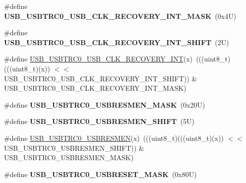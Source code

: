 \begin{DoxyCompactItemize}
\mbox{\label{group___u_s_b___register___masks_ga588ecdb5189b26730014b09713a834db}} 
\#define {\bfseries U\+S\+B\+\_\+\+U\+S\+B\+T\+R\+C0\+\_\+\+U\+S\+B\+\_\+\+C\+L\+K\+\_\+\+R\+E\+C\+O\+V\+E\+R\+Y\+\_\+\+I\+N\+T\+\_\+\+M\+A\+SK}~(0x4\+U)
\item 
\mbox{\label{group___u_s_b___register___masks_ga10874c5a9f0c051773c2ed43af3375fe}} 
\#define {\bfseries U\+S\+B\+\_\+\+U\+S\+B\+T\+R\+C0\+\_\+\+U\+S\+B\+\_\+\+C\+L\+K\+\_\+\+R\+E\+C\+O\+V\+E\+R\+Y\+\_\+\+I\+N\+T\+\_\+\+S\+H\+I\+FT}~(2\+U)
\item 
\#define \mbox{\hyperlink{group___u_s_b___register___masks_ga894dfcada08a458b11641438d7ed4589}{U\+S\+B\+\_\+\+U\+S\+B\+T\+R\+C0\+\_\+\+U\+S\+B\+\_\+\+C\+L\+K\+\_\+\+R\+E\+C\+O\+V\+E\+R\+Y\+\_\+\+I\+NT}}(x)~(((uint8\+\_\+t)(((uint8\+\_\+t)(x)) $<$$<$ U\+S\+B\+\_\+\+U\+S\+B\+T\+R\+C0\+\_\+\+U\+S\+B\+\_\+\+C\+L\+K\+\_\+\+R\+E\+C\+O\+V\+E\+R\+Y\+\_\+\+I\+N\+T\+\_\+\+S\+H\+I\+FT)) \& U\+S\+B\+\_\+\+U\+S\+B\+T\+R\+C0\+\_\+\+U\+S\+B\+\_\+\+C\+L\+K\+\_\+\+R\+E\+C\+O\+V\+E\+R\+Y\+\_\+\+I\+N\+T\+\_\+\+M\+A\+SK)
\item 
\mbox{\label{group___u_s_b___register___masks_gaf236b1fdfa7f7dab54961c74538dfb75}} 
\#define {\bfseries U\+S\+B\+\_\+\+U\+S\+B\+T\+R\+C0\+\_\+\+U\+S\+B\+R\+E\+S\+M\+E\+N\+\_\+\+M\+A\+SK}~(0x20\+U)
\item 
\mbox{\label{group___u_s_b___register___masks_ga4b62f293769f60cae99319d6bb1299e8}} 
\#define {\bfseries U\+S\+B\+\_\+\+U\+S\+B\+T\+R\+C0\+\_\+\+U\+S\+B\+R\+E\+S\+M\+E\+N\+\_\+\+S\+H\+I\+FT}~(5\+U)
\item 
\#define \mbox{\hyperlink{group___u_s_b___register___masks_ga8cfb473cdf63dce69fbae3b03e5fa0b9}{U\+S\+B\+\_\+\+U\+S\+B\+T\+R\+C0\+\_\+\+U\+S\+B\+R\+E\+S\+M\+EN}}(x)~(((uint8\+\_\+t)(((uint8\+\_\+t)(x)) $<$$<$ U\+S\+B\+\_\+\+U\+S\+B\+T\+R\+C0\+\_\+\+U\+S\+B\+R\+E\+S\+M\+E\+N\+\_\+\+S\+H\+I\+FT)) \& U\+S\+B\+\_\+\+U\+S\+B\+T\+R\+C0\+\_\+\+U\+S\+B\+R\+E\+S\+M\+E\+N\+\_\+\+M\+A\+SK)
\item 
\mbox{\label{group___u_s_b___register___masks_ga3b307f8358be6942775121b6a92243ab}} 
\#define {\bfseries U\+S\+B\+\_\+\+U\+S\+B\+T\+R\+C0\+\_\+\+U\+S\+B\+R\+E\+S\+E\+T\+\_\+\+M\+A\+SK}~(0x80\+U)

\end{DoxyCompactItemize}
